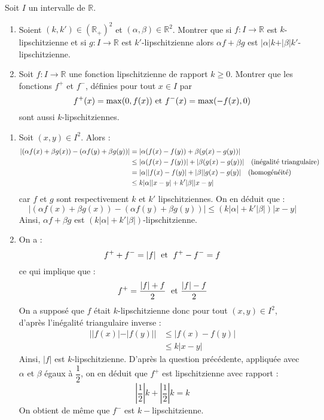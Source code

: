 \documentclass[a4paper,10pt]{report}
\begin{document}
\begin{Exa} Soit $I$ un intervalle de $\mathbb{R}$.

\begin{enumerate}
\item Soient $(k,k') \in (\mathbb{R}_+)^2$ et $(\alpha, \beta) \in \mathbb{R}^2$. Montrer que si $f : I \rightarrow \mathbb{R}$ est $k$-lipschitzienne et si $g : I \rightarrow \mathbb{R}$ est $k'$-lipschitzienne alors $\alpha f+ \beta g$ est $\vert \alpha \vert k  + \vert \beta \vert k'$-lipschitzienne.
\item Soit $f : I \rightarrow \mathbb{R}$ une fonction lipschitzienne de rapport $k \geq 0$. Montrer que les fonctions $f^+$ et $f^{-}$, définies pour tout $x \in I$ par 
$$ f^+(x)= \max(0,f(x)) \hbox{ et } f^{-}(x) = \max(-f(x),0) $$
sont aussi $k$-lipschitziennes.
\end{enumerate}
\end{Exa}

\corr 


\begin{enumerate}
\item Soit $(x,y) \in I^2$. Alors :
\begin{align*}
\vert (\alpha f(x)+ \beta g(x))-(\alpha f(y)+ \beta g(y)) \vert & = \vert \alpha (f(x)-f(y)) + \beta (g(x)-g(y)) \vert \\
& \leq \vert \alpha (f(x)-f(y)) \vert + \vert \beta (g(x)-g(y)) \vert \quad \hbox{(inégalité triangulaire)} \\
& = \vert \alpha \vert \vert f(x)-f(y) \vert + \vert \beta \vert \vert g(x)-g(y) \vert \quad \hbox{(homogénéité)} \\
& \leq k \vert \alpha \vert  \vert x-y \vert + k' \vert \beta \vert \vert x-y \vert 
\end{align*}
car $f$ et $g$ sont respectivement $k$ et $k'$ lipschitziennes. On en déduit que :
$$ \vert (\alpha f(x)+ \beta g(x))-(\alpha f(y)+ \beta g(y)) \vert \leq (k \vert \alpha \vert + k' \vert \beta \vert) \vert x-y \vert$$
Ainsi, $\alpha f+ \beta g$ est $(k \vert \alpha \vert + k' \vert \beta \vert)$-lipschitzienne.
\item On a :
$$ f^{+} + f^{-} = \vert f \vert \; \hbox{ et } \; f^{+}-f^{-} = f$$
ce qui implique que :
$$ f^{+} = \dfrac{\vert f \vert+f}{2} \; \hbox{ et } \dfrac{\vert f \vert - f}{2}$$
On a supposé que $f$ était $k$-lipschitzienne donc pour tout $(x,y) \in I^2$, d'après l'inégalité triangulaire \og inverse \fg :
\begin{align*}
\vert \vert f(x) \vert - \vert f(y) \vert \vert & \leq \vert f(x)-f(y) \vert  \\
& \leq k \vert x-y \vert
\end{align*}
Ainsi, $\vert f \vert$ est $k$-lipschitzienne. D'après la question précédente, appliquée avec $\alpha$ et $\beta$ égaux à $\dfrac{1}{2}$, on en déduit que $f^{+}$ est lipschitzienne avec rapport :
$$ \left\vert \dfrac{1}{2} \right\vert k + \left\vert \dfrac{1}{2} \right\vert k = k$$
On obtient de même que $f^{-}$ est $k-$lipschitzienne.
\end{enumerate}
\end{document}
